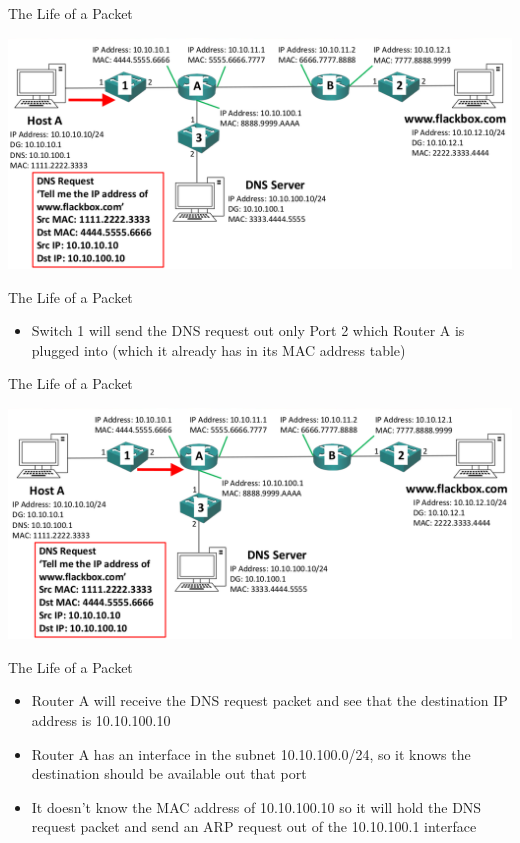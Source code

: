 \documentclass[pdflatex,compress,mathserif]{beamer}
\begin{document}
\begin{frame}{The Life of a Packet}
	\begin{center}
		\includegraphics[width=\linewidth]{img/img21}
	\end{center}
\end{frame}

\begin{frame}{The Life of a Packet}
	\begin{itemize}
		\item Switch 1 will send the DNS request out only Port 2 which Router A is plugged into (which it already has in its MAC address table)
	\end{itemize}
\end{frame}

\begin{frame}{The Life of a Packet}
	\begin{center}
		\includegraphics[width=\linewidth]{img/img22}
	\end{center}
\end{frame}

\begin{frame}{The Life of a Packet}
	\begin{itemize}
		\item Router A will receive the DNS request packet and see that the destination IP address is 10.10.100.10
		\item Router A has an interface in the subnet 10.10.100.0/24, so it knows the destination should be available out that port
		\item It doesn’t know the MAC address of 10.10.100.10 so it will hold the DNS request packet and send an ARP request out of the 10.10.100.1
		interface
	\end{itemize}
\end{frame}
\end{document}
